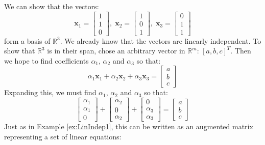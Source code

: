 \begin{example} We can show that the vectors:
\begin{displaymath}
\mathbf{x}_1 = \begin{bmatrix}
1\\1\\0
\end{bmatrix},\;
\mathbf{x}_2 = \begin{bmatrix}
1\\0\\1
\end{bmatrix},\;
\mathbf{x}_3 = \begin{bmatrix}
0\\1\\1
\end{bmatrix}
\end{displaymath}
form a basis of $\mathbb{R}^3$. We already know that the vectors are linearly independent. To show that $\mathbb{R}^3$ is in their span, chose an arbitrary vector in $\mathbb{R}^m$: $[a, b, c]^T$. Then we hope to find coefficients $\alpha_1$, $\alpha_2$ and $\alpha_3$ so that:
\begin{displaymath}
\alpha_1\mathbf{x}_1 + \alpha_2\mathbf{x}_2 + \alpha_3\mathbf{x}_3 = 
\begin{bmatrix}
a\\b\\c
\end{bmatrix}
\end{displaymath}
Expanding this, we must find $\alpha_1$, $\alpha_2$ and $\alpha_3$ so that:
\begin{displaymath}
\begin{bmatrix}
\alpha_1\\\alpha_1\\0
\end{bmatrix}+
\begin{bmatrix}
\alpha_2\\0\\\alpha_2
\end{bmatrix}+
\begin{bmatrix}
0\\\alpha_3\\\alpha_3
\end{bmatrix} = 
\begin{bmatrix}
a\\b\\c
\end{bmatrix}
\end{displaymath}
Just as in Example \ref{ex:LinIndep1}, this can be written as an augmented matrix representing a set of linear equations:

\end{example}
